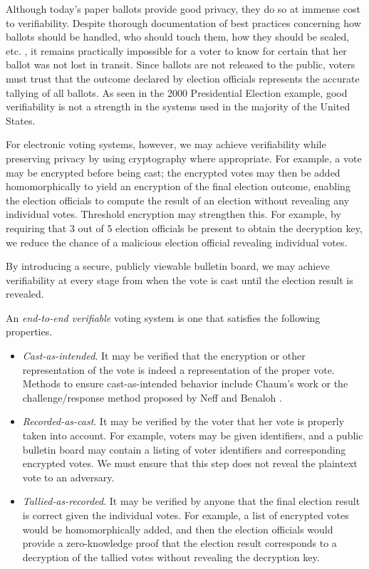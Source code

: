 Although today's paper ballots provide good privacy, they do so at immense cost to verifiability. Despite thorough documentation of best practices concerning how ballots should be handled, who should touch them, how they should be sealed, etc. \cite{ace-electoral-network}, it remains practically impossible for a voter to know for certain that her ballot was not lost in transit. Since ballots are not released to the public, voters must trust that the outcome declared by election officials represents the accurate tallying of all ballots. As seen in the 2000 Presidential Election example, good verifiability is not a strength in the systems used in the majority of the United States.

For electronic voting systems, however, we may achieve verifiability while preserving privacy by using cryptography where appropriate. For example, a vote may be encrypted before being cast; the encrypted votes may then be added homomorphically to yield an encryption of the final election outcome, enabling the election officials to compute the result of an election without revealing any individual votes. Threshold encryption may strengthen this. For example, by requiring that 3 out of 5 election officials be present to obtain the decryption key, we reduce the chance of a malicious election official revealing individual votes.

By introducing a secure, publicly viewable bulletin board, we may achieve verifiability at every stage from when the vote is cast until the election result is revealed.

\begin{definition} An \emph{end-to-end verifiable} voting system is one that satisfies the following properties.
\begin{itemize}
\item \emph{Cast-as-intended}. It may be verified that the encryption or other representation of the vote is indeed a representation of the proper vote. Methods to ensure cast-as-intended behavior include Chaum's work \cite{chaum04} or the challenge/response method proposed by Neff \cite{neff04} and Benaloh \cite{benaloh06}.
\item \emph{Recorded-as-cast}. It may be verified by the voter that her vote is properly taken into account. For example, voters may be given identifiers, and a public bulletin board may contain a listing of voter identifiers and corresponding encrypted votes. We must ensure that this step does not reveal the plaintext vote to an adversary.
\item \emph{Tallied-as-recorded}. It may be verified by anyone that the final election result is correct given the individual votes. For example, a list of encrypted votes would be homomorphically added, and then the election officials would provide a zero-knowledge proof that the election result corresponds to a decryption of the tallied votes without revealing the decryption key.
\end{itemize}
\end{definition}

